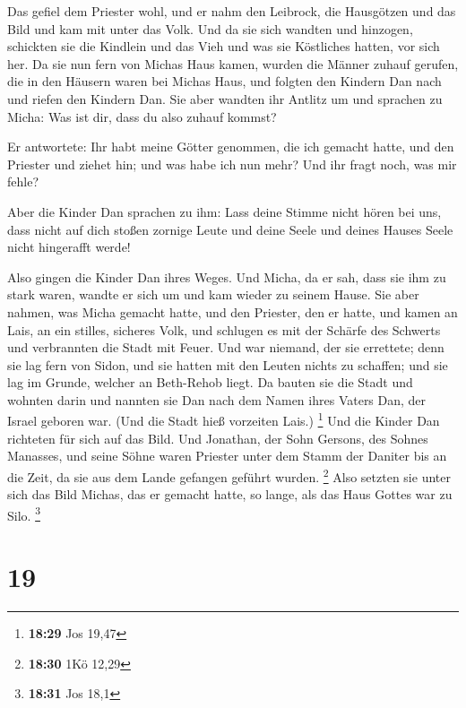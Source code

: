  Das gefiel dem Priester wohl, und er nahm den Leibrock,
die Hausgötzen und das Bild und kam mit unter das Volk. 
Und da sie sich wandten und hinzogen, schickten sie die Kindlein und das
Vieh und was sie Köstliches hatten, vor sich her.  Da sie
nun fern von Michas Haus kamen, wurden die Männer zuhauf gerufen, die in
den Häusern waren bei Michas Haus, und folgten den Kindern Dan nach und
riefen den Kindern Dan.  Sie aber wandten ihr Antlitz um
und sprachen zu Micha: Was ist dir, dass du also zuhauf kommst?

 Er antwortete: Ihr habt meine Götter genommen, die ich
gemacht hatte, und den Priester und ziehet hin; und was habe ich nun
mehr? Und ihr fragt noch, was mir fehle?

 Aber die Kinder Dan sprachen zu ihm: Lass deine Stimme
nicht hören bei uns, dass nicht auf dich stoßen zornige Leute und deine
Seele und deines Hauses Seele nicht hingerafft werde!

 Also gingen die Kinder Dan ihres Weges. Und Micha, da er
sah, dass sie ihm zu stark waren, wandte er sich um und kam wieder zu
seinem Hause.  Sie aber nahmen, was Micha gemacht hatte,
und den Priester, den er hatte, und kamen an Lais, an ein stilles,
sicheres Volk, und schlugen es mit der Schärfe des Schwerts und
verbrannten die Stadt mit Feuer.  Und war niemand, der
sie errettete; denn sie lag fern von Sidon, und sie hatten mit den
Leuten nichts zu schaffen; und sie lag im Grunde, welcher an Beth-Rehob
liegt. Da bauten sie die Stadt und wohnten darin  und
nannten sie Dan nach dem Namen ihres Vaters Dan, der Israel geboren war.
(Und die Stadt hieß vorzeiten Lais.) \footnote{\textbf{18:29} Jos 19,47}
 Und die Kinder Dan richteten für sich auf das Bild. Und
Jonathan, der Sohn Gersons, des Sohnes Manasses, und seine Söhne waren
Priester unter dem Stamm der Daniter bis an die Zeit, da sie aus dem
Lande gefangen geführt wurden. \footnote{\textbf{18:30} 1Kö 12,29}
 Also setzten sie unter sich das Bild Michas, das er
gemacht hatte, so lange, als das Haus Gottes war zu Silo. \footnote{\textbf{18:31}
  Jos 18,1}

\hypertarget{section-8}{%
\section{19}\label{section-8}}

